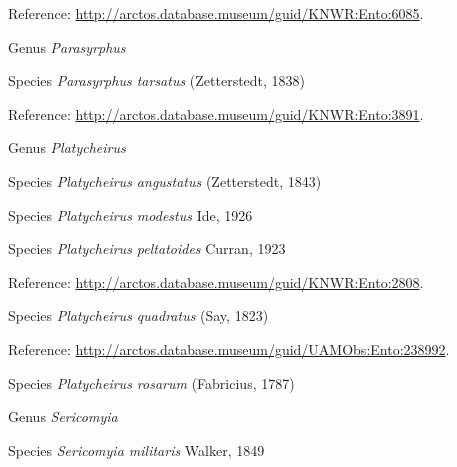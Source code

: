 \documentclass[9pt, article]{memoir}
\begin{document}
\begin{multicols}{2}
\vspace{6pt}Reference: 
\url{http://arctos.database.museum/guid/KNWR:Ento:6085}.

\vspace{6pt}\noindent\hspace{30pt}Genus \textit{Parasyrphus}


\vspace{6pt}\noindent\hspace{36pt}Species \textit{Parasyrphus tarsatus} (Zetterstedt, 1838)


\vspace{6pt}Reference: 
\url{http://arctos.database.museum/guid/KNWR:Ento:3891}.

\vspace{6pt}\noindent\hspace{30pt}Genus \textit{Platycheirus}


\vspace{6pt}\noindent\hspace{36pt}Species \textit{Platycheirus angustatus} (Zetterstedt, 1843)


\vspace{6pt}\noindent\hspace{36pt}Species \textit{Platycheirus modestus} Ide, 1926


\vspace{6pt}\noindent\hspace{36pt}Species \textit{Platycheirus peltatoides} Curran, 1923


\vspace{6pt}Reference: 
\url{http://arctos.database.museum/guid/KNWR:Ento:2808}.

\vspace{6pt}\noindent\hspace{36pt}Species \textit{Platycheirus quadratus} (Say, 1823)


\vspace{6pt}Reference: 
\url{http://arctos.database.museum/guid/UAMObs:Ento:238992}.

\vspace{6pt}\noindent\hspace{36pt}Species \textit{Platycheirus rosarum} (Fabricius, 1787)


\vspace{6pt}\noindent\hspace{30pt}Genus \textit{Sericomyia}


\vspace{6pt}\noindent\hspace{36pt}Species \textit{Sericomyia militaris} Walker, 1849



\end{multicols}
\end{document}
